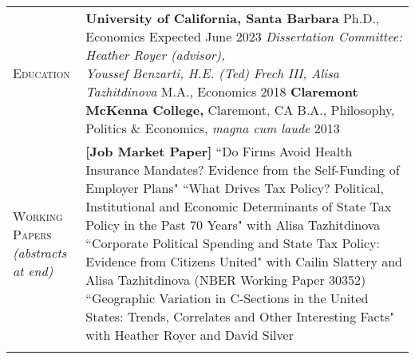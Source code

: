 \documentclass[11pt]{article}
\begin{document}
\begin{tabularx}{\textwidth}{@{}Y Z@{}}
	
	\textsc{Education} &
	\textbf{University of California, Santa Barbara}
	\vspace{3pt} \newline
	\hspace*{15pt} Ph.D., Economics \hfill Expected June 2023%
	\vspace{3pt} \newline
	\hspace*{15pt} \textit{Dissertation Committee: Heather Royer (advisor), \newline \hspace*{15pt} Youssef Benzarti, H.E. (Ted) Frech III, Alisa Tazhitdinova} 
	\vspace{10pt} \newline
	\hspace*{15pt} M.A., Economics \hfill 2018%
	\vspace{15pt} \newline
	\textbf{Claremont McKenna College,} Claremont, CA 
	\vspace{3pt} \newline
	\hspace*{15pt} B.A., Philosophy, Politics \& Economics, \textit{magna cum laude} \hfill 2013%
    \\  \addlinespace[20pt] 

	\textsc{Working \newline Papers} \vspace{5pt} \newline \textit{(abstracts \newline at end)}& 
	 \textbf{[Job Market Paper]} ``Do Firms Avoid Health Insurance Mandates? \newline Evidence from the Self-Funding of Employer Plans"
	\vspace{12pt} \newline
	``What Drives Tax Policy? Political, Institutional and Economic Determinants \newline of State Tax Policy in the Past 70 Years" with Alisa Tazhitdinova 
	\vspace{12pt} \newline
	``Corporate Political Spending and State Tax Policy: Evidence from Citizens United" \newline with Cailin Slattery and Alisa Tazhitdinova (NBER Working Paper 30352)
	\vspace{12pt} \newline
	``Geographic Variation in C-Sections in the United States: Trends, Correlates \newline and Other Interesting Facts" with Heather Royer and David Silver 
     \\ \addlinespace[20pt] 
    

\end{tabularx}
\end{document}
